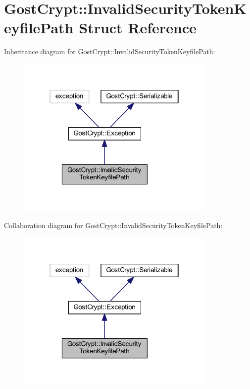 \hypertarget{struct_gost_crypt_1_1_invalid_security_token_keyfile_path}{}\section{Gost\+Crypt\+:\+:Invalid\+Security\+Token\+Keyfile\+Path Struct Reference}
\label{struct_gost_crypt_1_1_invalid_security_token_keyfile_path}


Inheritance diagram for Gost\+Crypt\+:\+:Invalid\+Security\+Token\+Keyfile\+Path\+:
\nopagebreak
\begin{figure}[H]
\begin{center}
\leavevmode
\includegraphics[width=274pt]{struct_gost_crypt_1_1_invalid_security_token_keyfile_path__inherit__graph}
\end{center}
\end{figure}


Collaboration diagram for Gost\+Crypt\+:\+:Invalid\+Security\+Token\+Keyfile\+Path\+:
\nopagebreak
\begin{figure}[H]
\begin{center}
\leavevmode
\includegraphics[width=274pt]{struct_gost_crypt_1_1_invalid_security_token_keyfile_path__coll__graph}
\end{center}
\end{figure}
